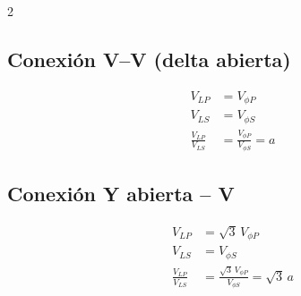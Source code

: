 \documentclass{article}
\begin{document}
\begin{multicols}{2}
\subsection*{Conexión V--V (delta abierta)}
\begin{align}
  V_{LP} &= V_{\phi P} \\
  V_{LS} &= V_{\phi S} \\
  \frac{V_{LP}}{V_{LS}} &= \frac{V_{\phi P}}{V_{\phi S}} = a
\end{align}

\subsection*{Conexión Y abierta -- V}
\begin{align}
  V_{LP} &= \sqrt{3}\, V_{\phi P} \\
  V_{LS} &= V_{\phi S} \\
  \frac{V_{LP}}{V_{LS}} &= \frac{\sqrt{3}\, V_{\phi P}}{V_{\phi S}} = \sqrt{3}\, a
\end{align}
\end{multicols}
\end{document}
